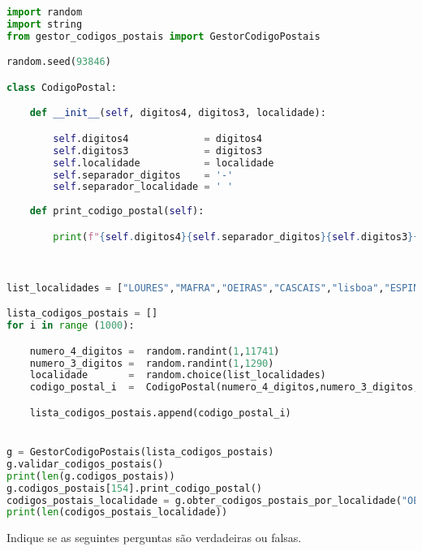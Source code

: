 \documentclass[12pt,varwidth=16cm,border=17pt]{standalone}
\begin{document}
\begin{lstlisting}[language=Python]
import random
import string
from gestor_codigos_postais import GestorCodigoPostais

random.seed(93846)

class CodigoPostal:

    def __init__(self, digitos4, digitos3, localidade):

        self.digitos4             = digitos4
        self.digitos3             = digitos3
        self.localidade           = localidade
        self.separador_digitos    = '-'
        self.separador_localidade = ' '
    
    def print_codigo_postal(self):

        print(f"{self.digitos4}{self.separador_digitos}{self.digitos3}{self.separador_localidade}{self.localidade}")

        

list_localidades = ["LOURES","MAFRA","OEIRAS","CASCAIS","lisboa","ESPINHO","MAIA","Amarante","valongo","OVAR","Pombal","Batalha"]

lista_codigos_postais = []
for i in range (1000):

    numero_4_digitos =  random.randint(1,11741)
    numero_3_digitos =  random.randint(1,1290)
    localidade       =  random.choice(list_localidades)
    codigo_postal_i  =  CodigoPostal(numero_4_digitos,numero_3_digitos,localidade)

    lista_codigos_postais.append(codigo_postal_i)


g = GestorCodigoPostais(lista_codigos_postais)
g.validar_codigos_postais()
print(len(g.codigos_postais))
g.codigos_postais[154].print_codigo_postal()
codigos_postais_localidade = g.obter_codigos_postais_por_localidade("OEIRAS")
print(len(codigos_postais_localidade))
\end{lstlisting}

Indique se as seguintes perguntas são verdadeiras ou falsas.
\end{document}
